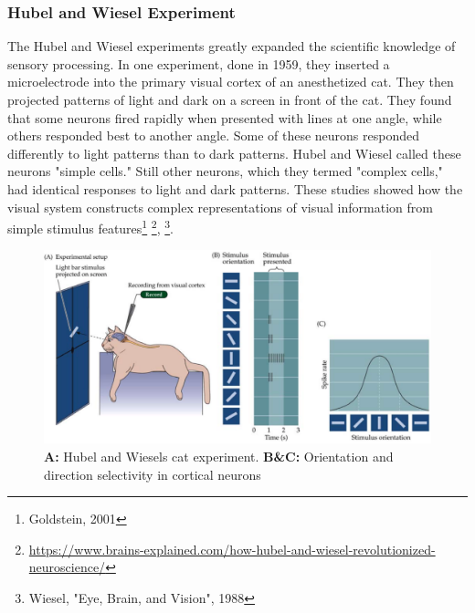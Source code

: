 \documentclass[main]{subfiles}
\begin{document}
\subsubsection{Hubel and Wiesel Experiment}
The Hubel and Wiesel experiments greatly expanded the scientific knowledge of sensory processing. In one experiment, done in 1959, they inserted a microelectrode into the primary visual cortex of an anesthetized cat. They then projected patterns of light and dark on a screen in front of the cat. They found that some neurons fired rapidly when presented with lines at one angle, while others responded best to another angle. Some of these neurons responded differently to light patterns than to dark patterns. Hubel and Wiesel called these neurons "simple cells." Still other neurons, which they termed "complex cells," had identical responses to light and dark patterns. These studies showed how the visual system constructs complex representations of visual information from simple stimulus features\footnote{Goldstein, 2001} \footnote{\url{https://www.brains-explained.com/how-hubel-and-wiesel-revolutionized-neuroscience/}}, \footnote{Wiesel, "Eye, Brain, and Vision", 1988}.

\begin{figure}[H]
    \centering
    \includegraphics[width=0.8\linewidth]{01_Introduction/figures/hubelwieselexperiment.png}
    \caption{\textbf{A:} Hubel and Wiesels cat experiment. \textbf{B\&C:} Orientation and direction selectivity in cortical neurons}
    \label{fig:basalandcerebellum}
\end{figure}
\end{document}
